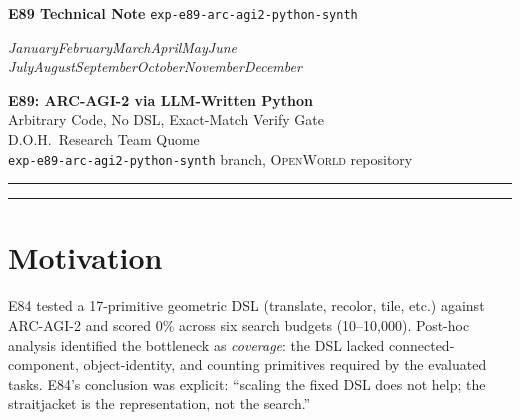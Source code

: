 \documentclass[11pt]{article}
\newcommand{\openworld}{\textsc{OpenWorld}}
\newcommand{\monthyeartoday}{%
  \ifcase\month\or January\or February\or March\or April\or May\or June\or
  July\or August\or September\or October\or November\or December\fi
  \space\number\year}
\begin{document}
\thispagestyle{empty}
\noindent
\begin{minipage}[c]{0.65\textwidth}
  \raggedright\textbf{E89 Technical Note} \quad \texttt{exp-e89-arc-agi2-python-synth}
\end{minipage}\hfill
\begin{minipage}[c]{0.35\textwidth}
  \raggedleft\itshape \monthyeartoday
\end{minipage}

\vspace{1em}

\begin{center}
  {\LARGE\bfseries E89: ARC-AGI-2 via LLM-Written Python}\\[0.4em]
  {\large Arbitrary Code, No DSL, Exact-Match Verify Gate}\\[0.8em]
  {\normalsize D.O.H.\ Research Team \quad Quome}\\[0.3em]
  {\small\texttt{exp-e89-arc-agi2-python-synth} branch, \openworld{} repository}
\end{center}

\vspace{0.5em}
\hrule
\vspace{0.5em}

\begin{abstract}
We test whether removing a fixed DSL constraint improves LLM-based program
synthesis on ARC-AGI-2.  E84 (fixed 17-primitive geometric DSL) scored 0\%
and attributed failure to coverage gaps.  E89 removes that constraint
entirely: the synthesis agent writes arbitrary Python with no vocabulary
restrictions, accepted only when programs \emph{exactly} reproduce every
demo pair.  Burst-1 (30 tasks, 3 candidates/task, \texttt{claude-sonnet-4-6})
scores \textbf{0/30 (0\%)}—identical to E84.  We conclude that the binding
bottleneck is not DSL coverage but LLM rule-inference correctness under
few-shot conditions.
\end{abstract}

\vspace{0.5em}
\hrule

\section{Motivation}
\label{sec:motivation}

E84 tested a 17-primitive geometric DSL (translate, recolor, tile, etc.)
against ARC-AGI-2 and scored 0\% across six search budgets (10--10{,}000).
Post-hoc analysis identified the bottleneck as \emph{coverage}: the DSL
lacked connected-component, object-identity, and counting primitives required
by the evaluated tasks.  E84's conclusion was explicit: ``scaling the fixed
DSL does not help; the straitjacket is the representation, not the search.''
\end{document}
